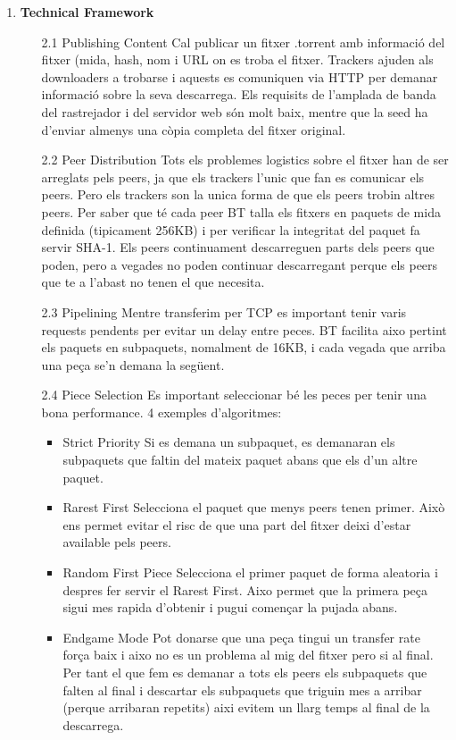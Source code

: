 \documentclass[a4paper, 10pt]{article}
\begin{document}
\begin{enumerate}
    \item \textbf{Technical Framework}
    \begin{enumerate}
        \item[2.1] Publishing Content
        Cal publicar un fitxer .torrent amb informació del fitxer (mida, hash, nom i URL on es troba el fitxer. Trackers ajuden als downloaders a trobarse i aquests es comuniquen via HTTP per demanar informació sobre la seva descarrega. Els requisits de l’amplada de banda del rastrejador i del servidor web són
        molt baix, mentre que la seed ha d’enviar almenys una
        còpia completa del fitxer original.
        \item[2.2] Peer Distribution
        Tots els problemes logistics sobre el fitxer han de ser arreglats pels peers, ja que els trackers l'unic que fan es comunicar els peers. Pero els trackers son la unica forma de que els peers trobin altres peers.
        Per saber que té cada peer BT talla els fitxers en paquets de mida definida (tipicament 256KB) i per verificar la integritat del paquet fa servir SHA-1. Els peers continuament descarreguen parts dels peers que poden, pero a vegades no poden continuar descarregant perque els peers que te a l'abast no tenen el que necesita.
        \item[2.3] Pipelining
        Mentre transferim per TCP es important tenir varis requests pendents per evitar un delay entre peces. BT facilita aixo pertint els paquets en subpaquets, nomalment de 16KB, i cada vegada que arriba una peça se'n demana la següent.
        \item[2.4] Piece Selection
        Es important seleccionar bé les peces per tenir una bona performance. 4 exemples d'algoritmes:
        \begin{itemize}
            \item Strict Priority
            Si es demana un subpaquet, es demanaran els subpaquets que faltin del mateix paquet abans que els d'un altre paquet.
            \item Rarest First
            Selecciona el paquet que menys peers tenen primer. Això ens permet evitar el risc de que una part del fitxer deixi d'estar available pels peers.
            \item Random First Piece
            Selecciona el primer paquet de forma aleatoria i despres fer servir el Rarest First. Aixo permet que la primera peça sigui mes rapida d'obtenir i pugui començar la pujada abans.
            \item Endgame Mode
            Pot donarse que una peça tingui un transfer rate força baix i aixo no es un problema al mig del fitxer pero si al final. Per tant el que fem es demanar a tots els peers els subpaquets que falten al final i descartar els subpaquets que triguin mes a arribar (perque arribaran repetits) aixi evitem un llarg temps al final de la descarrega.
        \end{itemize}
    \end{enumerate}
    

\end{enumerate}
\end{document}
